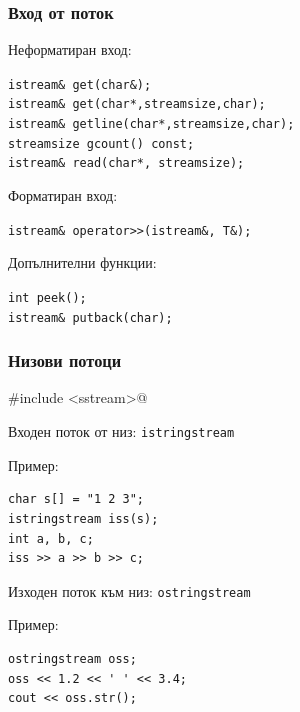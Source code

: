 \documentclass{beamer}
\begin{document}
\begin{frame}[fragile]
  \frametitle{Вход от поток}

  Неформатиран вход:
  \vspace{1em}

  \verb#istream& get(char&);#\\
  \verb#istream& get(char*,streamsize,char);#\\
  \verb#istream& getline(char*,streamsize,char);#\\
  \verb#streamsize gcount() const;#\\
  \verb#istream& read(char*, streamsize);#
  \vspace{2em}

  Форматиран вход:
  \vspace{1em}

  \verb#istream& operator>>(istream&, T&);#  

  \vspace{2em}

  Допълнителни функции:

  \verb#int peek();#\\
  \verb#istream& putback(char);#
\end{frame}

\begin{frame}[fragile]
  \frametitle{Низови потоци}
  
  \verb@#include <sstream>@
  \vspace{1em}

  Входен поток от низ: \tt{istringstream}
  \vspace{1em}

  Пример:
\begin{verbatim}
char s[] = "1 2 3";
istringstream iss(s);
int a, b, c;
iss >> a >> b >> c;
\end{verbatim}
  \vspace{1em}

  Изходен поток към низ: \tt{ostringstream}
  \vspace{1em}
  
  Пример:
\begin{verbatim}
ostringstream oss;
oss << 1.2 << ' ' << 3.4;
cout << oss.str();
\end{verbatim}
\end{frame}
\end{document}
